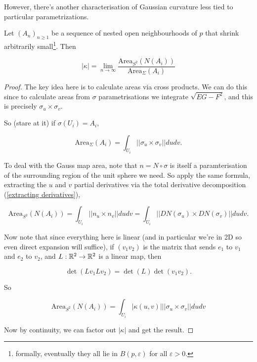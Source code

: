 \documentclass[11pt]{scrartcl}
\begin{document}
However, there's another characterisation of Gaussian curvature less tied to particular parametrizations.

\begin{proposition}

Let $(A_n)_{n \ge 1}$ be a sequence of nested open neighbourhoods of $p$ that shrink arbitrarily small\footnote{formally, eventually they all lie in $B(p, \varepsilon)$ for all $\varepsilon > 0$.}. Then 

\begin{equation}
    |\kappa| = \lim_{n \rightarrow \infty} \frac{\text{Area}_{S^2}(N(A_i))}{\text{Area}_\Sigma(A_i)}
\end{equation} 

\begin{proof}
    The key idea here is to calculate areas via cross products. We can do this since to calculate areas from $\sigma$ parametrisations we integrate $\sqrt{EG-F^2}$, and this is precisely $\sigma_u \times \sigma_v$.
    
    So (stare at it) if $\sigma(U_i) = A_i$,

    \begin{equation}
        \text{Area}_\Sigma(A_i) = \int_{U_i} ||\sigma_u \times \sigma_v|| du dv.
    \end{equation}

    To deal with the Gauss map area, note that $n = N \circ \sigma$ is itself a paramterisation of the surrounding region of the unit sphere we need. So apply the same formula, extracting the $u$ and $v$ partial derivatives via the total derivative decomposition (\ref{extracting derivatives}),

    \begin{equation}
        \text{Area}_{S^2}(N(A_i)) = \int_{U_i} ||n_u \times n_v|| du dv = \int_{U_i} ||DN(\sigma_u) \times DN(\sigma_v)|| du dv.
    \end{equation}

    Now note that since everything here is linear (and in particular we're in 2D so even direct expansion will suffice), if $(v_1 v_2)$ is the matrix that sends $e_1$ to $v_1$ and $e_2$ to $v_2$, and $L:\mathbb R^2 \rightarrow \mathbb R^2$ is a linear map, then

    \begin{equation}
        \det(Lv_1 Lv_2) = \det (L) \det(v_1 v_2).
    \end{equation}

    So 

    \begin{equation}
        \text{Area}_{S^2}(N(A_i)) = \int_{U_i} |\kappa(u,v)| ||\sigma_u \times \sigma_v|| du dv %
    \end{equation}

    Now by continuity, we can factor out $|\kappa|$ and get the result.
\end{proof}
\end{proposition}
\end{document}

